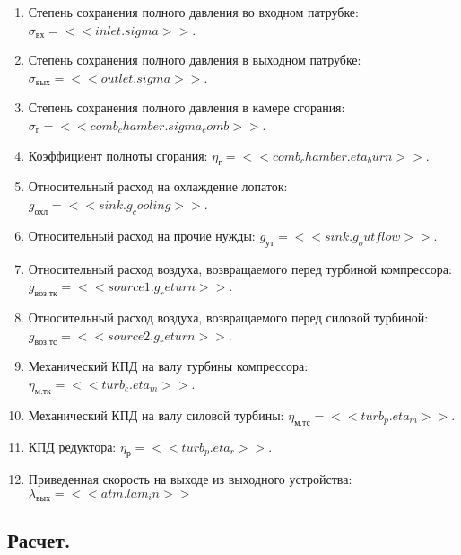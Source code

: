 \begin{enumerate}
	\item Степень сохранения полного давления во входном патрубке: $\sigma_{вх} = << inlet.sigma >>$.
	\item Степень сохранения полного давления в выходном патрубке: $\sigma_{вых} = << outlet.sigma >>$.
	\item Степень сохранения полного давления в камере сгорания: $\sigma_г = << comb_chamber.sigma_comb >>$.
	\item Коэффициент полноты сгорания: $\eta_г = << comb_chamber.eta_burn >> $. 
	\item Относительный расход на охлаждение лопаток: $g_{охл} = << sink.g_cooling >>$.
	\item Относительный расход на прочие нужды: $g_{ут} = << sink.g_outflow >>$.
	\item Относительный расход воздуха, возвращаемого перед турбиной компрессора: $g_{воз.тк} = << source1.g_return >>$.
	\item Относительный расход воздуха, возвращаемого перед силовой турбиной: $g_{воз.тс} = << source2.g_return >>$.
	\item Механический КПД на валу турбины компрессора: $\eta_{м.тк} = << turb_c.eta_m >>$.
	\item Механический КПД на валу силовой турбины: $\eta_{м.тс} = << turb_p.eta_m >>$.
	\item КПД редуктора: $ \eta_р = << turb_p.eta_r >>$.
	\item Приведенная скорость на выходе из выходного устройства: $ \lambda_{вых} = << atm.lam_in >> $

\end{enumerate}

\subsection{Расчет.}


